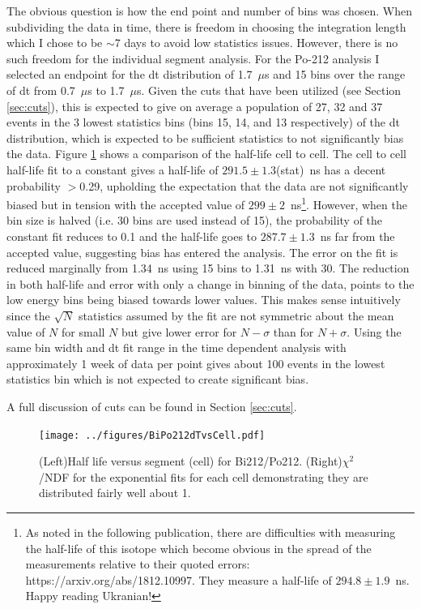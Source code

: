 The obvious question is how the end point and number of bins was chosen. When subdividing the data in time, there is freedom in choosing the integration length which I chose to be $\sim$7 days to avoid low statistics issues. However, there is no such freedom for the individual segment analysis. For the Po-212 analysis I selected an endpoint for the dt distribution of 1.7~$\mu$s and 15 bins over the range of dt from 0.7~$\mu$s to 1.7~$\mu$s. Given the cuts that have been utilized (see Section \ref{sec:cuts}), this is expected to give on average a population of 27, 32 and 37 events in the 3 lowest statistics bins (bins 15, 14, and 13 respectively) of the dt distribution, which is expected to be sufficient statistics to not significantly bias the data. Figure \ref{fig:Po212thalfvscell} shows a comparison of the half-life cell to cell. The cell to cell half-life fit to a constant gives a half-life of $291.5\pm1.3$(stat)~ns has a decent probability $>$0.29, upholding the expectation that the data are not significantly biased but in tension with the accepted value of $299\pm2$~ns\footnote{As noted in the following publication, there are difficulties with measuring the half-life of this isotope which become obvious in the spread of the measurements relative to their quoted errors: https://arxiv.org/abs/1812.10997. They measure a half-life of $294.8\pm1.9$~ns. Happy reading Ukranian!}. However, when the bin size is halved (i.e. 30 bins are used instead of 15), the probability of the constant fit reduces to 0.1 and the half-life goes to $287.7\pm1.3$~ns far from the accepted value, suggesting bias has entered the analysis. The error on the fit is reduced marginally from 1.34~ns using 15 bins to 1.31~ns with 30. The reduction in both half-life and error with only a change in binning of the data, points to the low energy bins being biased towards lower values. This makes sense intuitively since the $\sqrt{N}$ statistics assumed by the fit are not symmetric about the mean value of $N$ for small $N$ but give lower error for $N-\sigma$ than for $N+\sigma$. Using the same bin width and dt fit range in the time dependent analysis with approximately 1 week of data per point gives about 100 events in the lowest statistics bin which is not expected to create significant bias. 

A full discussion of cuts can be found in Section \ref{sec:cuts}.
\begin{figure}[!h]
	\centering
	\texttt{[image: ../figures/BiPo212dTvsCell.pdf]}
	\caption{\label{fig:Po212thalfvscell}(Left)Half life versus segment (cell) for Bi212/Po212. (Right)$\chi^2$/NDF for the exponential fits for each cell demonstrating they are distributed fairly well about 1.}
\end{figure}

